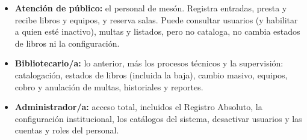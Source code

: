 \documentclass[11pt,a4paper]{report}
\begin{document}
\begin{itemize}
  \item \textbf{Atención de público:} el personal de mesón. Registra
  entradas, presta y recibe libros y equipos, y reserva salas. Puede
  consultar usuarios (y habilitar a quien esté inactivo), multas y
  listados, pero no cataloga, no cambia estados de libros ni la
  configuración.
  \item \textbf{Bibliotecario/a:} lo anterior, más los procesos técnicos y
  la supervisión: catalogación, estados de libros (incluida la baja),
  cambio masivo, equipos, cobro y anulación de multas, historiales y
  reportes.
  \item \textbf{Administrador/a:} acceso total, incluidos el Registro
  Absoluto, la configuración institucional, los catálogos del sistema,
  desactivar usuarios y las cuentas y roles del personal.
\end{itemize}
\end{document}
